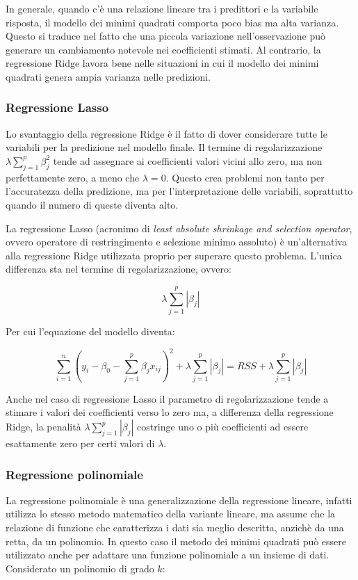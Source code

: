 In generale, quando c’è una relazione lineare tra i predittori e la variabile risposta, il modello dei minimi quadrati comporta poco bias ma alta varianza. Questo si traduce nel fatto che una piccola variazione nell'osservazione può generare un cambiamento notevole nei coefficienti stimati. Al contrario, la regressione Ridge lavora bene nelle situazioni in cui il modello dei minimi quadrati genera ampia varianza nelle predizioni. \cite{tesi_polito}

\subsubsection{Regressione Lasso}\label{sssec:regressione-lasso}
Lo svantaggio della regressione Ridge è il fatto di dover considerare tutte le variabili per la predizione nel modello finale. Il termine di regolarizzazione $\lambda \sum_{j=1}^{p} \beta_{j}^{2}$ tende ad assegnare ai coefficienti valori vicini allo zero, ma non perfettamente zero, a meno che $\lambda = 0$.
Questo crea problemi non tanto per l’accuratezza della predizione, ma per l’interpretazione delle variabili, soprattutto quando il numero di queste diventa alto.

La regressione Lasso (acronimo di \textit{least absolute shrinkage and selection operator}, ovvero operatore di restringimento e selezione minimo assoluto) è un’alternativa alla regressione Ridge utilizzata proprio per superare questo problema. L'unica differenza sta nel termine di regolarizzazione, ovvero:

$$\lambda \sum_{j=1}^{p}\left|\beta_{j}\right|$$\smallskip

Per cui l'equazione del modello diventa:

$$\sum_{i=1}^{n}\left(y_{i}-\beta_{0}-\sum_{j=1}^{p} \beta_{j} x_{i j}\right)^{2}+\lambda \sum_{j=1}^{p}\left|\beta_{j}\right|=R S S+\lambda \sum_{j=1}^{p}\left|\beta_{j}\right|$$\smallskip

Anche nel caso di regressione Lasso il parametro di regolarizzazione tende a stimare i valori dei coefficienti verso lo zero ma, a differenza della regressione Ridge, la penalità $\lambda \sum_{j=1}^{p}\left|\beta_{j}\right|$ costringe uno o più coefficienti ad essere esattamente zero per certi valori di $\lambda$. \cite{tesi_polito}

\subsubsection{Regressione polinomiale}\label{sssec:regressione-polinomiale}
La regressione polinomiale è una generalizzazione della regressione lineare, infatti utilizza lo stesso metodo matematico della variante lineare, ma assume che la relazione di funzione che caratterizza i dati sia meglio descritta, anzichè da una retta, da un polinomio. In questo caso il metodo dei minimi quadrati può essere utilizzato anche per adattare una funzione polinomiale a un insieme di dati. Considerato un polinomio di grado $k$:

